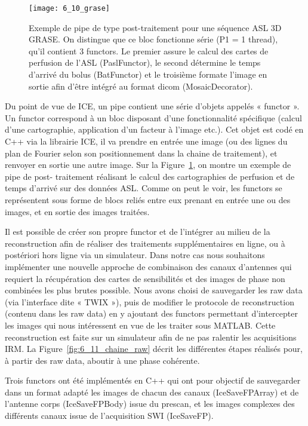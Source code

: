 {%
\begin{figure}[!t]
\centering
\texttt{[image: 6\_10\_grase]}
\caption{Exemple de pipe de type post-traitement pour une séquence ASL 3D GRASE. On distingue que ce bloc fonctionne
série (P1 = 1 thread), qu’il contient 3 functors. Le premier assure le calcul des cartes de perfusion de l’ASL (PaslFunctor), le
second détermine le temps d’arrivé du bolus (BatFunctor) et le troisième formate l’image en sortie afin d’être intégré au
format dicom (MosaicDecorator).}
\label{fig:6_10_grase}	
\end{figure}
Du point de vue de ICE, un pipe contient une série d’objets appelés « functor ». Un functor
correspond à un bloc disposant d’une fonctionnalité spécifique (calcul d’une cartographie, application
d’un facteur à l’image etc.). Cet objet est codé en C++ via la librairie ICE, il va prendre en entrée une
image (ou des lignes du plan de Fourier selon son positionnement dans la chaine de traitement), et
renvoyer en sortie une autre image. Sur la Figure~\ref{fig:6_10_grase}, on montre un exemple de pipe de post-
traitement réalisant le calcul des cartographies de perfusion et de temps d’arrivé sur des données ASL.
Comme on peut le voir, les functors se représentent sous forme de blocs reliés entre eux prenant en
entrée une ou des images, et en sortie des images traitées.

Il est possible de créer son propre functor et de l’intégrer au milieu de la reconstruction afin
de réaliser des traitements supplémentaires en ligne, ou à postériori hors ligne via un simulateur. Dans
notre cas nous souhaitons implémenter une nouvelle approche de combinaison des canaux d’antennes
qui requiert la récupération des cartes de sensibilités et des images de phase non combinées les plus
brutes possible. Nous avons choisi de sauvegarder les raw data (via l’interface dite « TWIX »), puis de
modifier le protocole de reconstruction (contenu dans les raw data) en y ajoutant des functors
permettant d’intercepter les images qui nous intéressent en vue de les traiter sous MATLAB. Cette
reconstruction est faite sur un simulateur afin de ne pas ralentir les acquisitions IRM. La Figure~\ref{fig:6_11_chaine_raw}
décrit les différentes étapes réalisés pour, à partir des raw data, aboutir à une phase cohérente.

Trois functors ont été implémentés en C++ qui ont pour objectif de sauvegarder dans un format
adapté les images de chacun des canaux (IceSaveFPArray) et de l’antenne corps (IceSaveFPBody) issue
du prescan, et les images complexes des différents canaux issue de l’acquisition SWI (IceSaveFP).

}
